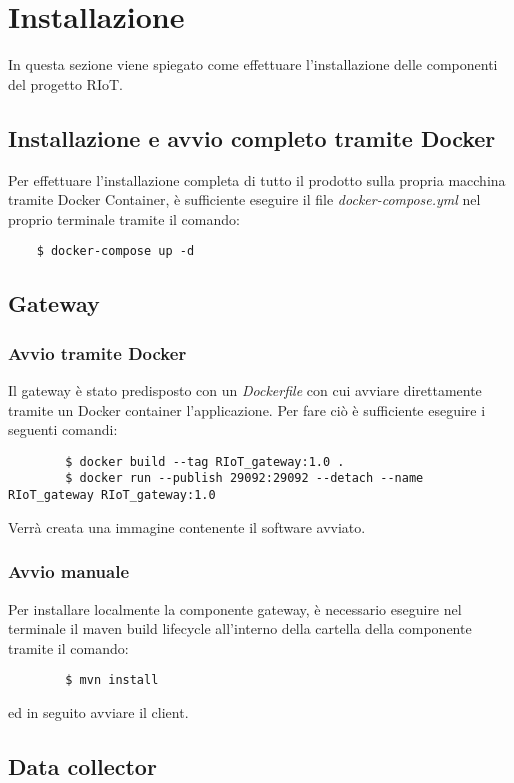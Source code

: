 \section{Installazione}
	In questa sezione viene spiegato come effettuare l'installazione delle componenti del progetto RIoT.

	\subsection{Installazione e avvio completo tramite Docker}
	
	Per effettuare l'installazione completa di tutto il prodotto sulla propria macchina tramite Docker Container, è sufficiente eseguire il file \textit{docker-compose.yml} nel proprio terminale tramite il comando:
	\begin{verbatim}
	$ docker-compose up -d
	\end{verbatim}

	\subsection{Gateway}
		
		\subsubsection{Avvio tramite Docker}
		Il gateway è stato predisposto con un \textit{Dockerfile} con cui avviare direttamente tramite un Docker container l'applicazione. Per fare ciò è sufficiente eseguire i seguenti comandi:
		\begin{verbatim}
		$ docker build --tag RIoT_gateway:1.0 .
		$ docker run --publish 29092:29092 --detach --name RIoT_gateway RIoT_gateway:1.0
		\end{verbatim}
		Verrà creata una immagine contenente il software avviato.

		\subsubsection{Avvio manuale}
		Per installare localmente la componente gateway, è necessario eseguire nel terminale il maven build lifecycle all'interno della cartella della componente tramite il comando:
		\begin{verbatim}
		$ mvn install
		\end{verbatim}
		ed in seguito avviare il client.

	\subsection{Data collector}

